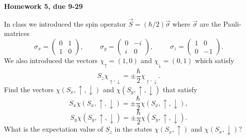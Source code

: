    
\pagestyle{plain}

\centerline{\bf\Large Homework 5, due 9-29}
\vspace*{0.5cm}

In class we introduced the spin operator 
$\vec{S}=(\hbar/2)\vec{\sigma}$ where
$\vec\sigma$ are the Pauli-matrices
\[
\sigma_x = \left(\begin{array}{cc} 0 & 1 \\ 1 & 0
                 \end{array}\right), \hspace{1cm}
\sigma_y = \left(\begin{array}{cc} 0 & -i \\ i & 0
                 \end{array}\right), \hspace{1cm}
\sigma_z = \left(\begin{array}{cc} 1 & 0 \\ 0 & -1
                 \end{array}\right).
\]
We also introduced the vectors $\chi_\uparrow= (1,0)$
and $\chi_\downarrow=(0,1)$ which satisfy 
\[
S_z\chi_{\uparrow,\downarrow}=\pm\frac{\hbar}{2}
\chi_{\uparrow,\downarrow}.
\]
Find the vectors $\chi(S_x,\uparrow,\downarrow)$
and $\chi(S_y,\uparrow,\downarrow)$ that 
satisfy
\[
S_x\chi(S_x,\uparrow,\downarrow)=\pm\frac{\hbar}{2}
\chi(S_x,\uparrow,\downarrow),
\]
\[
S_y\chi(S_y,\uparrow,\downarrow)=\pm\frac{\hbar}{2}
\chi(S_y,\uparrow,\downarrow).
\]
What is the expectation value of $S_z$ in the 
states $\chi(S_x,\uparrow)$ and $\chi(S_x,\downarrow)$?


   
 

 


  

